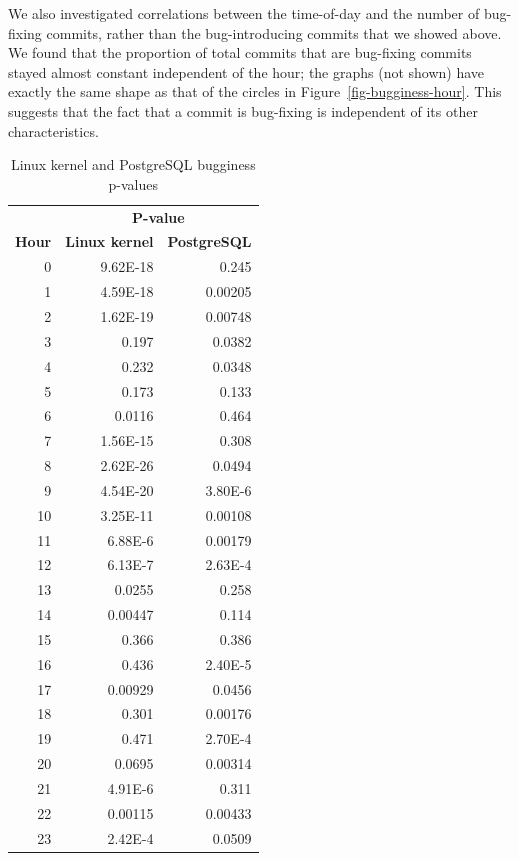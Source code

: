 
We also investigated correlations between the time-of-day and the number of
bug-fixing commits, rather than the bug-introducing commits that we showed
above. We found that the proportion of total commits that are bug-fixing commits
stayed almost constant independent of the hour; the graphs (not shown) have
exactly the same shape as that of the circles in
Figure~\ref{fig-bugginess-hour}. This suggests that the fact that a commit is
bug-fixing is independent of its other characteristics.

\begin{table}[tbh!]
\begin{center}
\small
\begin{tabular}{r|r|r}
\multicolumn{1}{c}{} & \multicolumn{2}{c}{{\bf P-value}} \\
\multicolumn{1}{c|}{{\bf Hour}} & \multicolumn{1}{c|}{{\bf Linux kernel}} &
\multicolumn{1}{c}{{\bf PostgreSQL}} \\
\hline
0  & 9.62E-18 & 0.245   \\
1  & 4.59E-18 & 0.00205 \\
2  & 1.62E-19 & 0.00748 \\
3  & 0.197    & 0.0382  \\
4  & 0.232    & 0.0348  \\
5  & 0.173    & 0.133   \\
6  & 0.0116   & 0.464   \\
7  & 1.56E-15 & 0.308   \\
8  & 2.62E-26 & 0.0494  \\
9  & 4.54E-20 & 3.80E-6 \\
10 & 3.25E-11 & 0.00108 \\
11 & 6.88E-6  & 0.00179 \\
12 & 6.13E-7  & 2.63E-4 \\
13 & 0.0255   & 0.258   \\
14 & 0.00447  & 0.114   \\
15 & 0.366    & 0.386   \\
16 & 0.436    & 2.40E-5 \\
17 & 0.00929  & 0.0456  \\
18 & 0.301    & 0.00176 \\
19 & 0.471    & 2.70E-4 \\
20 & 0.0695   & 0.00314 \\
21 & 4.91E-6  & 0.311   \\
22 & 0.00115  & 0.00433 \\
23 & 2.42E-4  & 0.0509  \\
\end{tabular}
\end{center}
\caption{\label{tbl-pvalues}Linux kernel and PostgreSQL bugginess p-values}
\end{table}

